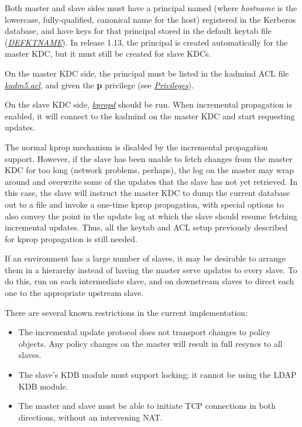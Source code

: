 \documentclass[letterpaper,10pt,english]{sphinxmanual}
\begin{document}
Both master and slave sides must have a principal named
 (where \emph{hostname} is the lowercase,
fully-qualified, canonical name for the host) registered in the
Kerberos database, and have keys for that principal stored in the
default keytab file ({\hyperref[mitK5defaults:paths]{\emph{DEFKTNAME}}}).  In release 1.13, the
 principal is created automatically for the master
KDC, but it must still be created for slave KDCs.

On the master KDC side, the  principal must be
listed in the kadmind ACL file {\hyperref[admin/conf_files/kadm5_acl:kadm5-acl-5]{\emph{kadm5.acl}}}, and given the
\textbf{p} privilege (see {\hyperref[admin/database:privileges]{\emph{Privileges}}}).

On the slave KDC side, {\hyperref[admin/admin_commands/kpropd:kpropd-8]{\emph{kpropd}}} should be run.  When
incremental propagation is enabled, it will connect to the kadmind on
the master KDC and start requesting updates.

The normal kprop mechanism is disabled by the incremental propagation
support.  However, if the slave has been unable to fetch changes from
the master KDC for too long (network problems, perhaps), the log on
the master may wrap around and overwrite some of the updates that the
slave has not yet retrieved.  In this case, the slave will instruct
the master KDC to dump the current database out to a file and invoke a
one-time kprop propagation, with special options to also convey the
point in the update log at which the slave should resume fetching
incremental updates.  Thus, all the keytab and ACL setup previously
described for kprop propagation is still needed.

If an environment has a large number of slaves, it may be desirable to
arrange them in a hierarchy instead of having the master serve updates
to every slave.  To do this, run  on each
intermediate slave, and  on downstream
slaves to direct each one to the appropriate upstream slave.

There are several known restrictions in the current implementation:
\begin{itemize}
\item {} 
The incremental update protocol does not transport changes to policy
objects.  Any policy changes on the master will result in full
resyncs to all slaves.

\item {} 
The slave's KDB module must support locking; it cannot be using the
LDAP KDB module.

\item {} 
The master and slave must be able to initiate TCP connections in
both directions, without an intervening NAT.

\end{itemize}
\end{document}
